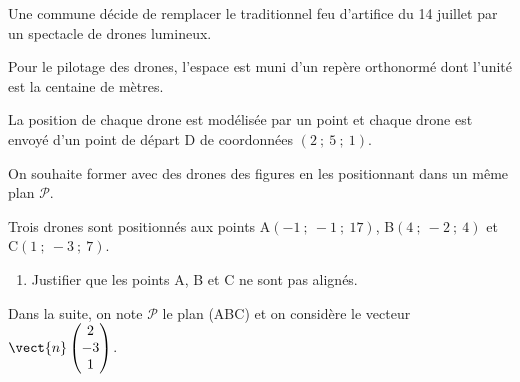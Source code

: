 \medskip

Une commune décide de remplacer le traditionnel feu d'artifice du 14 juillet par un
spectacle de drones lumineux.

\smallskip

Pour le pilotage des drones, l'espace est muni d'un repère orthonormé \Oijk{} dont l'unité est la centaine de mètres.

\smallskip

La position de chaque drone est modélisée par un point et chaque drone est envoyé d'un point de départ D de coordonnées $(2~;~5~;~1)$.

\smallskip

On souhaite former avec des drones des figures en les positionnant dans un même plan $\mathcal{P}$.

\smallskip

Trois drones sont positionnés aux points A$(-1~;~-1~;~17)$, B$(4~;~-2~;~4)$ et C$(1~;~-3~;~7)$.

\begin{enumerate}
	\item Justifier que les points A, B et C ne sont pas alignés.
\end{enumerate}

Dans la suite, on note $\mathcal{P}$ le plan (ABC) et on considère le vecteur $\vect{n} \begin{pmatrix}2\\-3\\1\end{pmatrix}$.

